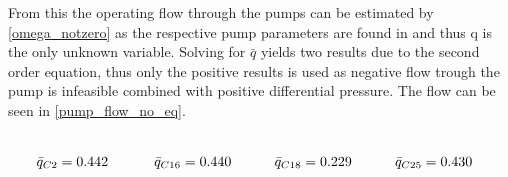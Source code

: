 From this the operating flow through the pumps can be estimated by \eqref{omega_notzero} as the respective pump parameters are found in  and thus q is the only unknown variable.
Solving for $\bar{q}$ yields two results due to the second order equation, thus only the positive results is used as negative flow trough the pump is infeasible combined with positive differential pressure. The flow can be seen in \ref{pump_flow_no_eq}.

\vspace{-0.5cm}
\begin{equation}
  \begin{minipage}[b]{0.25\textwidth}
  \begin{equation*}
  	\begin{split}
  		\bar{q}_{C2} &= 0.442
  	\end{split}
  \end{equation*}
  \end{minipage}
  \begin{minipage}[b]{0.25\textwidth}
  \begin{equation*}
  	\begin{split}
  		\bar{q}_{C16} &= 0.440
  	\end{split}
  \end{equation*}

  \end{minipage}
  \begin{minipage}[b]{0.25\textwidth}
  \begin{equation*}
  	\begin{split}
  		\bar{q}_{C18} &= 0.229
  	\end{split}
  \end{equation*}
  \end{minipage}
  \begin{minipage}[b]{0.25\textwidth}
  \begin{equation*}
  	\begin{split}
  		\bar{q}_{C25} &= 0.430
  	\end{split}
  \end{equation*}
  \end{minipage}
  \label{pump_flow_no_eq}
\end{equation}
\vspace{-0.2cm}





